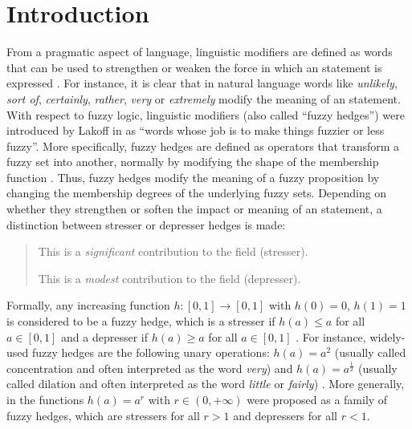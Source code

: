 
\graphicspath{{./_figures/04_tpowerinvariant/}}

\section{Introduction}

From a pragmatic aspect of language, linguistic modifiers are defined as words that can be used to strengthen or weaken the force in which an statement is expressed \cite{Nikula1996}. For instance, it is clear that in natural language words like \textit{unlikely}, \textit{sort of}, \textit{certainly}, \textit{rather}, \textit{very} or \textit{extremely} modify the meaning of an statement. With respect to fuzzy logic, linguistic modifiers (also called ``fuzzy hedges'') were introduced by Lakoff in \cite{Lakoff1973} as ``words whose job is to make things fuzzier or less fuzzy''. More specifically, fuzzy hedges are defined as operators that transform a fuzzy set into another, normally by modifying the shape of the membership function \cite{Zimmermann1991}. Thus, fuzzy hedges modify the meaning of a fuzzy proposition by changing the membership degrees of the underlying fuzzy sets. Depending on whether they strengthen or soften the impact or meaning of an statement, a distinction between stresser or depresser hedges is made:

\begin{quotation}
	This is a \textit{significant} contribution to the field (stresser).
	
	This is a \textit{modest} contribution to the field (depresser).
\end{quotation}

Formally, any increasing function $h:[0,1] \to [0,1]$ with $h(0)=0$, $h(1)=1$ is considered to be a fuzzy hedge, which is a stresser if $h(a)\leq a$ for all $a \in [0,1]$ and a depresser if $h(a) \geq a$ for all $a \in [0,1]$ \cite{Esteva2011}. For instance, widely-used fuzzy hedges are the following unary operations: $h(a)=a^2$ (usually called concentration and often interpreted as the word \textit{very}) and $h(a)= a^{\frac{1}{2}}$ (usually called dilation and often interpreted as the word \textit{little} or \textit{fairly}) \cite{Zimmermann1991}. More generally, in \cite{Baldwin1979,Nafarieh1991} the functions $h(a)=a^r$ with $r \in (0,+\infty)$ were proposed as a family of fuzzy hedges, which are stressers for all $r > 1$ and depressers for all $r < 1$.

